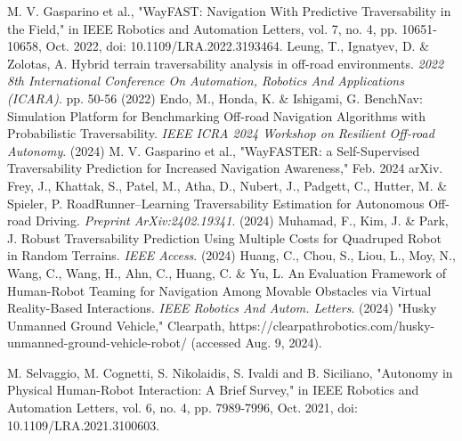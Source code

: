 \documentclass[letterpaper, 10 pt, conference]{ieeeconf}  %
\begin{document}




\begin{thebibliography}{99}

 M. V. Gasparino et al., "WayFAST: Navigation With Predictive Traversability in the Field," in IEEE Robotics and Automation Letters, vol. 7, no. 4, pp. 10651-10658, Oct. 2022, doi: 10.1109/LRA.2022.3193464.
Leung, T., Ignatyev, D. \& Zolotas, A. Hybrid terrain traversability analysis in off-road environments. {\em 2022 8th International Conference On Automation, Robotics And Applications (ICARA)}. pp. 50-56 (2022)
Endo, M., Honda, K. \& Ishigami, G. BenchNav: Simulation Platform for Benchmarking Off-road Navigation Algorithms with Probabilistic Traversability. {\em IEEE ICRA 2024 Workshop on Resilient Off-road Autonomy}. (2024)
 M. V. Gasparino et al., "WayFASTER: a Self-Supervised Traversability Prediction for Increased Navigation Awareness," Feb. 2024 arXiv.
Frey, J., Khattak, S., Patel, M., Atha, D., Nubert, J., Padgett, C., Hutter, M. \& Spieler, P. RoadRunner–Learning Traversability Estimation for Autonomous Off-road Driving. {\em Preprint ArXiv:2402.19341}. (2024)
Muhamad, F., Kim, J. \& Park, J. Robust Traversability Prediction Using Multiple Costs for Quadruped Robot in Random Terrains. {\em IEEE Access}. (2024)
Huang, C., Chou, S., Liou, L., Moy, N., Wang, C., Wang, H., Ahn, C., Huang, C. \& Yu, L. An Evaluation Framework of Human-Robot Teaming for Navigation Among Movable Obstacles via Virtual Reality-Based Interactions. {\em IEEE Robotics And Autom. Letters}. (2024)
"Husky Unmanned Ground Vehicle," Clearpath, https://clearpathrobotics.com/husky-unmanned-ground-vehicle-robot/ (accessed Aug. 9, 2024).

 M. Selvaggio, M. Cognetti, S. Nikolaidis, S. Ivaldi and B. Siciliano, "Autonomy in Physical Human-Robot Interaction: A Brief Survey," in IEEE Robotics and Automation Letters, vol. 6, no. 4, pp. 7989-7996, Oct. 2021, doi: 10.1109/LRA.2021.3100603.




\end{thebibliography}
\end{document}
